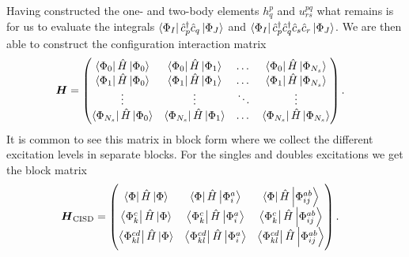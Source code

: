         Having constructed the one- and two-body elements $h^{p}_{q}$ and
        $u^{pq}_{rs}$ what remains is for us to evaluate the integrals
        $\bra{\Phi_I}\hat{c}_{p}^{\dagger}\hat{c}_{q}\ket{\Phi_J}$ and
        $\bra{\Phi_I}\hat{c}_{p}^{\dagger}\hat{c}_{q}^{\dagger}\hat{c}_{s}\hat{c}_{r}\ket{\Phi_J}$.
        We are then able to construct the configuration interaction matrix
        \begin{align}
            \boldsymbol{H}
            &=
            \begin{pmatrix}
                \bra{\Phi_0}\hat{H}\ket{\Phi_0} &
                \bra{\Phi_0}\hat{H}\ket{\Phi_1} &
                \dots &
                \bra{\Phi_0}\hat{H}\ket{\Phi_{N_s}} \\
                \bra{\Phi_1}\hat{H}\ket{\Phi_0} &
                \bra{\Phi_1}\hat{H}\ket{\Phi_1} &
                \dots &
                \bra{\Phi_1}\hat{H}\ket{\Phi_{N_s}} \\
                \vdots & \vdots & \ddots & \vdots \\
                \bra{\Phi_{N_s}}\hat{H}\ket{\Phi_0} &
                \bra{\Phi_{N_s}}\hat{H}\ket{\Phi_1} &
                \dots &
                \bra{\Phi_{N_s}}\hat{H}\ket{\Phi_{N_s}}
            \end{pmatrix}.
        \end{align}
        It is common to see this matrix in block form where we collect
        the different excitation levels in separate blocks.
        For the singles and doubles excitations we get the block matrix
        \begin{align}
            \boldsymbol{H}_{\text{CISD}}
            &=
            \begin{pmatrix}
                \bra{\Phi}\hat{H}\ket{\Phi} &
                \bra{\Phi}\hat{H}\ket{\Phi^{a}_{i}} &
                \bra{\Phi}\hat{H}\ket{\Phi^{ab}_{ij}} \\
                \bra{\Phi^{c}_{k}}\hat{H}\ket{\Phi} &
                \bra{\Phi^{c}_{k}}\hat{H}\ket{\Phi^{a}_{i}} &
                \bra{\Phi^{c}_{k}}\hat{H}\ket{\Phi^{ab}_{ij}} \\
                \bra{\Phi^{cd}_{kl}}\hat{H}\ket{\Phi} &
                \bra{\Phi^{cd}_{kl}}\hat{H}\ket{\Phi^{a}_{i}} &
                \bra{\Phi^{cd}_{kl}}\hat{H}\ket{\Phi^{ab}_{ij}} \\
            \end{pmatrix}.
        \end{align}

